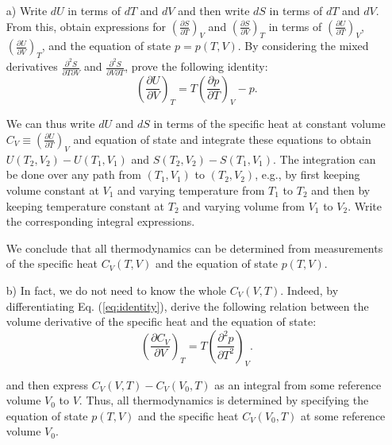 \documentclass{article}
\begin{document}
\begin{enumerate}
    \item[a)] Write $dU$ in terms of $dT$ and $dV$ and then write $dS$ in terms of $dT$ and $dV$. From this, obtain expressions for $\left(\frac{\partial S}{\partial T}\right)_V$ and $\left(\frac{\partial S}{\partial V}\right)_T$ in terms of $\left(\frac{\partial U}{\partial T}\right)_V$, $\left(\frac{\partial U}{\partial V}\right)_T$, and the equation of state $p = p(T, V)$. By considering the mixed derivatives $\frac{\partial^2 S}{\partial T \partial V}$ and $\frac{\partial^2 S}{\partial V \partial T}$, prove the following identity:
    \begin{equation}
        \left(\frac{\partial U}{\partial V}\right)_T = T\left(\frac{\partial p}{\partial T}\right)_V - p. \label{eq:identity}
    \end{equation}
    
    We can thus write $dU$ and $dS$ in terms of the specific heat at constant volume $C_V \equiv \left(\frac{\partial U}{\partial T}\right)_V$ and equation of state and integrate these equations to obtain $U(T_2, V_2) - U(T_1, V_1)$ and $S(T_2, V_2) - S(T_1, V_1)$. The integration can be done over any path from $(T_1, V_1)$ to $(T_2, V_2)$, e.g., by first keeping volume constant at $V_1$ and varying temperature from $T_1$ to $T_2$ and then by keeping temperature constant at $T_2$ and varying volume from $V_1$ to $V_2$. Write the corresponding integral expressions.
    
    We conclude that all thermodynamics can be determined from measurements of the specific heat $C_V(T, V)$ and the equation of state $p(T, V)$.
    
    \item[b)] In fact, we do not need to know the whole $C_V(V, T)$. Indeed, by differentiating Eq. (\ref{eq:identity}), derive the following relation between the volume derivative of the specific heat and the equation of state:
    \begin{equation}
        \left(\frac{\partial C_V}{\partial V}\right)_T = T\left(\frac{\partial^2 p}{\partial T^2}\right)_V. \label{eq:relation}
    \end{equation}
    
    and then express $C_V(V, T) - C_V(V_0, T)$ as an integral from some reference volume $V_0$ to $V$. Thus, all thermodynamics is determined by specifying the equation of state $p(T, V)$ and the specific heat $C_V(V_0, T)$ at some reference volume $V_0$.
    

\end{enumerate}
\end{document}
